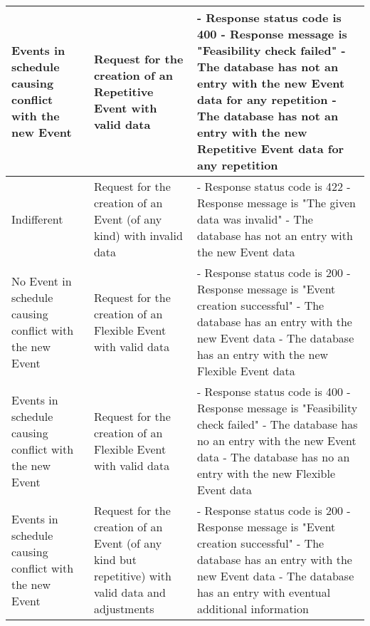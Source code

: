 \begin{center}
	\begin{tabular}{|p{}|p{}|p{}|}
		
		\hline
		Events in schedule causing conflict with the new Event &
		Request for the creation of an Repetitive Event with valid data & 
		- Response status code is 400 \newline
		- Response message is "Feasibility check failed" \newline
		- The database has not an entry with the new Event data for any repetition \newline
		- The database has not an entry with the new Repetitive Event data for any repetition
		\\
		
		\hline
		Indifferent &
		Request for the creation of an Event (of any kind) with invalid data & 
		- Response status code is 422 \newline
		- Response message is "The given data was invalid" \newline
		- The database has not an entry with the new Event data
		\\
		
		\hline
		No Event in schedule causing conflict with the new Event &
		Request for the creation of an Flexible Event with valid data & 
		- Response status code is 200 \newline
		- Response message is "Event creation successful" \newline
		- The database has an entry with the new Event data \newline
		- The database has an entry with the new Flexible Event data
		\\
		
		
		\hline
		Events in schedule causing conflict with the new Event &
		Request for the creation of an Flexible Event with valid data & 
		- Response status code is 400 \newline
		- Response message is "Feasibility check failed" \newline
		- The database has no an entry with the new Event data \newline
		- The database has no an entry with the new Flexible Event data
		\\
		
		\hline
		Events in schedule causing conflict with the new Event &
		Request for the creation of an Event (of any kind but repetitive) with valid data and adjustments& 
		- Response status code is 200 \newline
		- Response message is "Event creation successful" \newline
		- The database has an entry with the new Event data \newline
		- The database has an entry with eventual additional information
		\\
		
		\hline
		
	\end{tabular}
\end{center}

